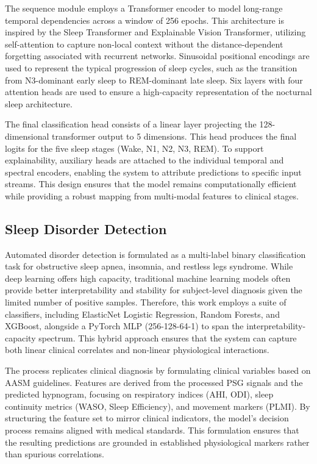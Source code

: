 The sequence module employs a Transformer encoder to model long-range temporal dependencies across a window of 256 epochs. This architecture is inspired by the Sleep Transformer and Explainable Vision Transformer, utilizing self-attention to capture non-local context without the distance-dependent forgetting associated with recurrent networks. Sinusoidal positional encodings are used to represent the typical progression of sleep cycles, such as the transition from N3-dominant early sleep to REM-dominant late sleep. Six layers with four attention heads are used to ensure a high-capacity representation of the nocturnal sleep architecture.

The final classification head consists of a linear layer projecting the 128-dimensional transformer output to 5 dimensions. This head produces the final logits for the five sleep stages (Wake, N1, N2, N3, REM). To support explainability, auxiliary heads are attached to the individual temporal and spectral encoders, enabling the system to attribute predictions to specific input streams. This design ensures that the model remains computationally efficient while providing a robust mapping from multi-modal features to clinical stages.

\subsection{Sleep Disorder Detection}

Automated disorder detection is formulated as a multi-label binary classification task for obstructive sleep apnea, insomnia, and restless legs syndrome. While deep learning offers high capacity, traditional machine learning models often provide better interpretability and stability for subject-level diagnosis given the limited number of positive samples. Therefore, this work employs a suite of classifiers, including ElasticNet Logistic Regression, Random Forests, and XGBoost, alongside a PyTorch MLP (256-128-64-1) to span the interpretability-capacity spectrum. This hybrid approach ensures that the system can capture both linear clinical correlates and non-linear physiological interactions.

The process replicates clinical diagnosis by formulating clinical variables based on AASM guidelines. Features are derived from the processed PSG signals and the predicted hypnogram, focusing on respiratory indices (AHI, ODI), sleep continuity metrics (WASO, Sleep Efficiency), and movement markers (PLMI). By structuring the feature set to mirror clinical indicators, the model's decision process remains aligned with medical standards. This formulation ensures that the resulting predictions are grounded in established physiological markers rather than spurious correlations.

